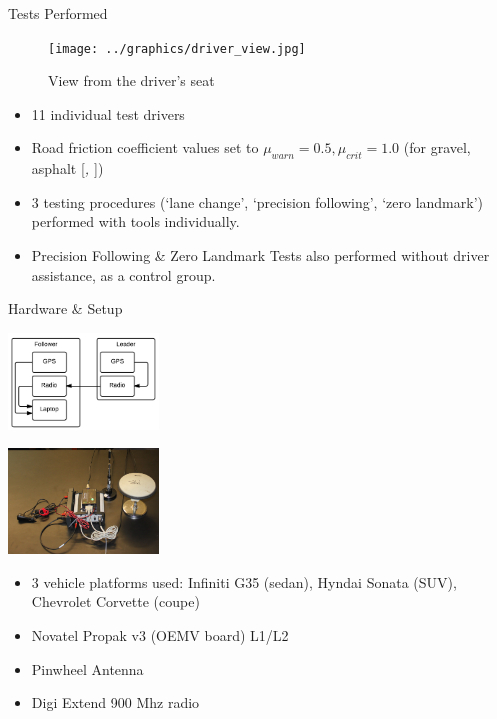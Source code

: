 \documentclass{beamer}
\newcommand{\citeitem}[1]{[\emph{\Citeauthor*{#1}, \citeyear{#1} }]}
\begin{document}
  \begin{frame}{Tests Performed}
    \begin{figure}[ht] \centering
      \texttt{[image: ../graphics/driver\_view.jpg]}
      \caption{\scriptsize View from the driver's seat}
    \end{figure}
    \vspace{-20pt}
    \begin{itemize} \scriptsize
      \item 11 individual test drivers
      \item Road friction coefficient values set to $\mu_{warn}=0.5,\mu_{crit}=1.0$ (for gravel, asphalt \citeitem{mu})
      \item 3 testing procedures (`lane change', `precision following', `zero landmark') performed with tools individually.
      \item Precision Following \& Zero Landmark Tests also performed without driver assistance, as a control group.
    \end{itemize}
  \end{frame}

  \begin{frame}{Hardware \& Setup}
      \begin{minipage}{0.45\textwidth}
        \centering
        \includegraphics[width=4cm]{../graphics/hardware_flow.png}
      \end{minipage}
      \begin{minipage}{0.45\textwidth}
        \centering
        \includegraphics[width=4cm]{../graphics/lead_hardware.jpg}
      \end{minipage}
      \begin{itemize}
        \item 3 vehicle platforms used: Infiniti G35 (sedan), Hyndai Sonata (SUV), Chevrolet Corvette (coupe)
        \item Novatel Propak v3 (OEMV board) L1/L2
        \item Pinwheel Antenna
        \item Digi Extend 900 Mhz radio
      \end{itemize}
  \end{frame}
\end{document}
